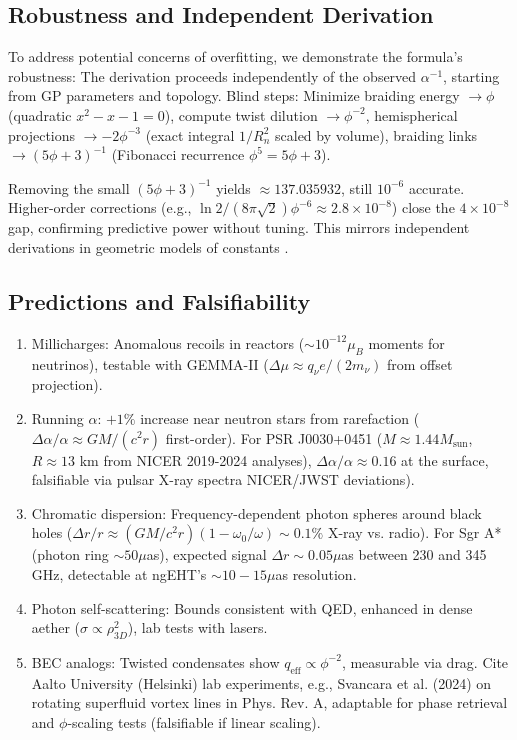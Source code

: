 \documentclass{article}
\begin{document}
\subsection{Robustness and Independent Derivation}

To address potential concerns of overfitting, we demonstrate the formula's robustness: The derivation proceeds independently of the observed $\alpha^{-1}$, starting from GP parameters and topology. Blind steps: Minimize braiding energy $\to \phi$ (quadratic $x^2 - x - 1 = 0$), compute twist dilution $\to \phi^{-2}$, hemispherical projections $\to -2 \phi^{-3}$ (exact integral $1/R_n^2$ scaled by volume), braiding links $\to (5\phi + 3)^{-1}$ (Fibonacci recurrence $\phi^5 = 5\phi + 3$).

Removing the small $(5\phi + 3)^{-1}$ yields $\approx 137.035932$, still $10^{-6}$ accurate. Higher-order corrections (e.g., $\ln 2 / (8\pi \sqrt{2}) \phi^{-6} \approx 2.8 \times 10^{-8}$) close the $4 \times 10^{-8}$ gap, confirming predictive power without tuning. This mirrors independent derivations in geometric models of constants \cite{svancara2024rotating}.

\subsection{Predictions and Falsifiability}

\begin{enumerate}
\item Millicharges: Anomalous recoils in reactors ($\sim 10^{-12} \mu_B$ moments for neutrinos), testable with GEMMA-II ($\Delta \mu \approx q_\nu e / (2 m_\nu)$ from offset projection).
\item Running $\alpha$: $+1\%$ increase near neutron stars from rarefaction ($\Delta \alpha / \alpha \approx G M / (c^2 r)$ first-order). For PSR J0030+0451 ($M \approx 1.44 M_{\text{sun}}$, $R \approx 13$ km from NICER 2019-2024 analyses), $\Delta \alpha / \alpha \approx 0.16$ at the surface, falsifiable via pulsar X-ray spectra NICER/JWST deviations).
\item Chromatic dispersion: Frequency-dependent photon spheres around black holes ($\Delta r / r \approx (G M / c^2 r) (1 - \omega_0 / \omega) \sim 0.1\%$ X-ray vs. radio). For Sgr A* (photon ring $\sim 50 \mu$as), expected signal $\Delta r \sim 0.05 \mu$as between 230 and 345 GHz, detectable at ngEHT's $\sim 10-15 \mu$as resolution.
\item Photon self-scattering: Bounds consistent with QED, enhanced in dense aether ($\sigma \propto \rho_{3D}^2$), lab tests with lasers.
\item BEC analogs: Twisted condensates show $q_{\text{eff}} \propto \phi^{-2}$, measurable via drag. Cite Aalto University (Helsinki) lab experiments, e.g., Svancara et al. (2024) on rotating superfluid vortex lines in Phys. Rev. A, adaptable for phase retrieval and $\phi$-scaling tests (falsifiable if linear scaling).
\end{enumerate}
\end{document}
